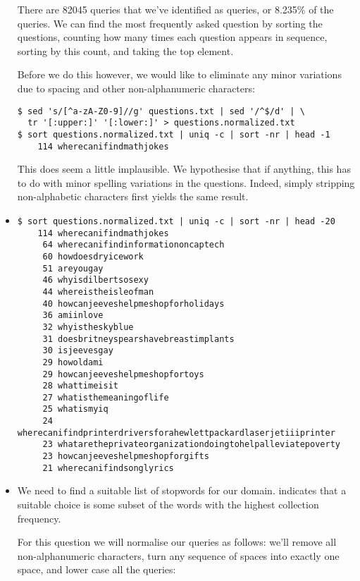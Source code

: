 \begin{itemize}
There are 82045 queries that we've identified as queries, or 8.235\% of the
queries. We can find the most frequently asked question by sorting the
questions, counting how many times each question appears in sequence, sorting
by this count, and taking the top element.

Before we do this however, we would like to eliminate any minor variations due
to spacing and other non-alphanumeric characters:

\begin{verbatim}
$ sed 's/[^a-zA-Z0-9]//g' questions.txt | sed '/^$/d' | \
  tr '[:upper:]' '[:lower:]' > questions.normalized.txt
$ sort questions.normalized.txt | uniq -c | sort -nr | head -1
    114 wherecanifindmathjokes
\end{verbatim}

This does seem a little implausible. We hypothesise that if anything, this has
to do with minor spelling variations in the questions. Indeed, simply stripping
non-alphabetic characters first yields the same result.

\item

\begin{verbatim}
$ sort questions.normalized.txt | uniq -c | sort -nr | head -20
    114 wherecanifindmathjokes
     64 wherecanifindinformationoncaptech
     60 howdoesdryicework
     51 areyougay
     46 whyisdilbertsosexy
     44 whereistheisleofman
     40 howcanjeeveshelpmeshopforholidays
     36 amiinlove
     32 whyistheskyblue
     31 doesbritneyspearshavebreastimplants
     30 isjeevesgay
     29 howoldami
     29 howcanjeeveshelpmeshopfortoys
     28 whattimeisit
     27 whatisthemeaningoflife
     25 whatismyiq
     24 wherecanifindprinterdriversforahewlettpackardlaserjetiiiprinter
     23 whataretheprivateorganizationdoingtohelpalleviatepoverty
     23 howcanjeeveshelpmeshopforgifts
     21 wherecanifindsonglyrics
\end{verbatim}

\item

We need to find a suitable list of stopwords for our domain. \cite[2.2.2/(p.
27)]{irbook} indicates that a suitable choice is some subset of the words with
the highest collection frequency.

For this question we will normalise our queries as follows: we'll remove all
non-alphanumeric characters, turn any sequence of spaces into exactly one
space, and lower case all the queries:


\end{itemize}
